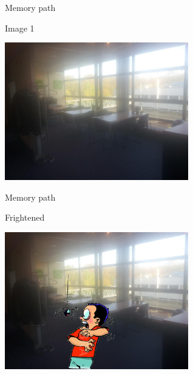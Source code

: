 \begin{frame}{Memory path}
  \begin{block}{Image 1}
    \begin{center}
      \includegraphics[height=6cm]{img/loci/01.jpg}
    \end{center}
  \end{block}
\end{frame}
\begin{frame}{Memory path}
  \begin{block}{Frightened}
    \begin{center}
      \includegraphics[height=6cm]{img/loci/01-frightened.jpg}
    \end{center}
  \end{block}
\end{frame}

